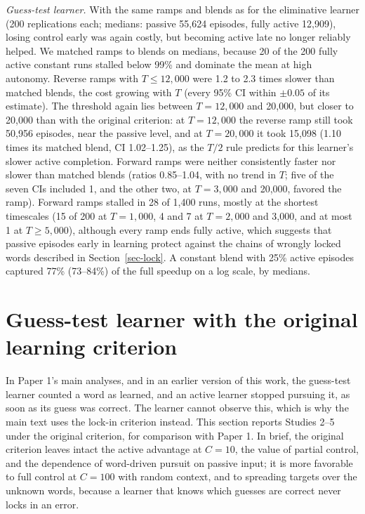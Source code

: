 \documentclass[11pt]{article}
\begin{document}
\textit{Guess-test learner.} With the same ramps and blends as for the eliminative learner (200 replications each; medians: passive 55,624 episodes, fully active 12,909), losing control early was again costly, but becoming active late no longer reliably helped. We matched ramps to blends on medians, because 20 of the 200 fully active constant runs stalled below 99\% and dominate the mean at high autonomy. Reverse ramps with $T \le 12{,}000$ were 1.2 to 2.3 times slower than matched blends, the cost growing with $T$ (every 95\% CI within $\pm 0.05$ of its estimate). The threshold again lies between $T=12{,}000$ and 20,000, but closer to 20,000 than with the original criterion: at $T=12{,}000$ the reverse ramp still took 50,956 episodes, near the passive level, and at $T=20{,}000$ it took 15,098 (1.10 times its matched blend, CI 1.02--1.25), as the $T/2$ rule predicts for this learner's slower active completion. Forward ramps were neither consistently faster nor slower than matched blends (ratios 0.85--1.04, with no trend in $T$; five of the seven CIs included 1, and the other two, at $T=3{,}000$ and 20,000, favored the ramp). Forward ramps stalled in 28 of 1,400 runs, mostly at the shortest timescales (15 of 200 at $T=1{,}000$, 4 and 7 at $T=2{,}000$ and 3,000, and at most 1 at $T \ge 5{,}000$), although every ramp ends fully active, which suggests that passive episodes early in learning protect against the chains of wrongly locked words described in Section~\ref{sec-lock}. A constant blend with 25\% active episodes captured 77\% (73--84\%) of the full speedup on a log scale, by medians.

\section{Guess-test learner with the original learning criterion}
\label{sec-oracle}
In Paper 1's main analyses, and in an earlier version of this work, the guess-test learner counted a word as learned, and an active learner stopped pursuing it, as soon as its guess was correct. The learner cannot observe this, which is why the main text uses the lock-in criterion instead. This section reports Studies 2--5 under the original criterion, for comparison with Paper 1. In brief, the original criterion leaves intact the active advantage at $C=10$, the value of partial control, and the dependence of word-driven pursuit on passive input; it is more favorable to full control at $C=100$ with random context, and to spreading targets over the unknown words, because a learner that knows which guesses are correct never locks in an error.
\end{document}
